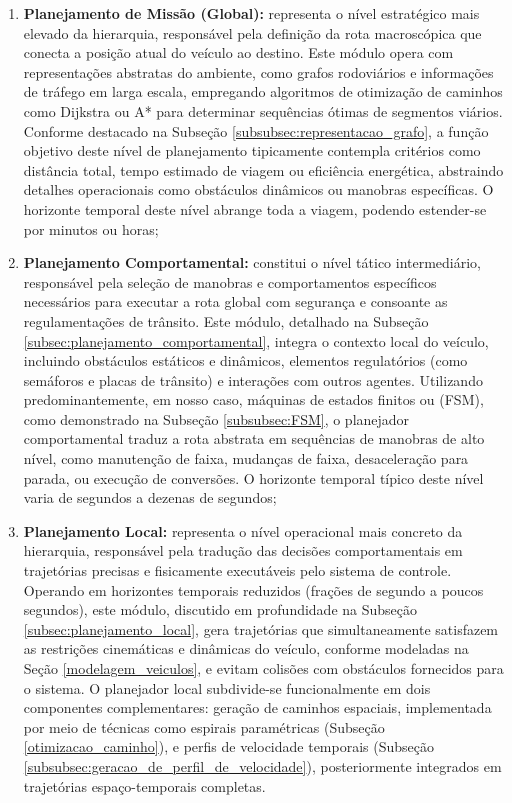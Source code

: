 \begin{enumerate}
    \item \textbf{Planejamento de Missão (Global):} representa o nível estratégico mais elevado da hierarquia, responsável pela definição da rota macroscópica que conecta a posição atual do veículo ao destino. Este módulo opera com representações abstratas do ambiente, como grafos rodoviários e informações de tráfego em larga escala, empregando algoritmos de otimização de caminhos como Dijkstra ou A* para determinar sequências ótimas de segmentos viários. Conforme destacado na Subseção \ref{subsubsec:representacao_grafo}, a função objetivo deste nível de planejamento tipicamente contempla critérios como distância total, tempo estimado de viagem ou eficiência energética, abstraindo detalhes operacionais como obstáculos dinâmicos ou manobras específicas. O horizonte temporal deste nível abrange toda a viagem, podendo estender-se por minutos ou horas;
    
    \item \textbf{Planejamento Comportamental:} constitui o nível tático intermediário, responsável pela seleção de manobras e comportamentos específicos necessários para executar a rota global com segurança e consoante as regulamentações de trânsito. Este módulo, detalhado na Subseção \ref{subsec:planejamento_comportamental}, integra o contexto local do veículo, incluindo obstáculos estáticos e dinâmicos, elementos regulatórios (como semáforos e placas de trânsito) e interações com outros agentes. Utilizando predominantemente, em nosso caso, máquinas de estados finitos ou (FSM), como demonstrado na Subseção \ref{subsubsec:FSM}, o planejador comportamental traduz a rota abstrata em sequências de manobras de alto nível, como manutenção de faixa, mudanças de faixa, desaceleração para parada, ou execução de conversões. O horizonte temporal típico deste nível varia de segundos a dezenas de segundos;
    
    \item \textbf{Planejamento Local:} representa o nível operacional mais concreto da hierarquia, responsável pela tradução das decisões comportamentais em trajetórias precisas e fisicamente executáveis pelo sistema de controle. Operando em horizontes temporais reduzidos (frações de segundo a poucos segundos), este módulo, discutido em profundidade na Subseção \ref{subsec:planejamento_local}, gera trajetórias que simultaneamente satisfazem as restrições cinemáticas e dinâmicas do veículo, conforme modeladas na Seção \ref{modelagem_veiculos}, e evitam colisões com obstáculos fornecidos para o sistema. O planejador local subdivide-se funcionalmente em dois componentes complementares: geração de caminhos espaciais, implementada por meio de técnicas como espirais paramétricas (Subseção \ref{otimizacao_caminho}), e perfis de velocidade temporais (Subseção \ref{subsubsec:geracao_de_perfil_de_velocidade}), posteriormente integrados em trajetórias espaço-temporais completas.
\end{enumerate}

